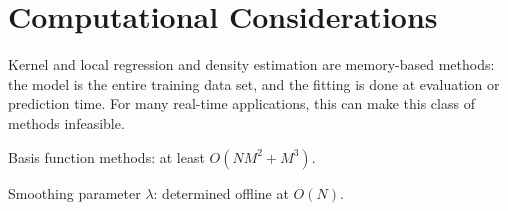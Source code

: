 \section{Computational Considerations}
Kernel and local regression and density estimation are memory-based methods:
the model is the entire training data set, and the fitting is done at
evaluation or prediction time. For many real-time applications, this can
make this class of methods infeasible. 

Basis function methods: at least $O(NM^2+M^3)$. 

Smoothing parameter $\lambda$: determined offline at $O(N)$. 